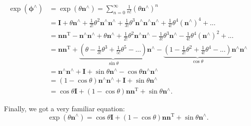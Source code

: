 \begin{align*}
\exp \left( {{\boldsymbol{\phi} ^ \wedge }} \right) &= \exp \left( {\theta {\mathbf{n}^ \wedge }} \right) = \sum\limits_ {n = 0}^\infty {\frac{1}{{n!}}{{\left( {\theta {\mathbf{n}^ \wedge }} \right)}^n}} \\
&= \mathbf{I} + \theta {\mathbf{n}^ \wedge } + \frac{1}{{2!}}{\theta ^2}{\mathbf{n}^ \wedge }{\mathbf{n}^ \wedge } + \frac{1}{{3!}}{\theta ^3}{\mathbf{n}^ \wedge }{\mathbf{n}^ \wedge }{\mathbf{n}^ \wedge } + \frac{1}{{4!}}{\theta ^4}{\left( {{\mathbf{n}^ \wedge }} \right)^4} + ... \\
&= \mathbf{n} {\mathbf{n}^\mathrm{T}} - {\mathbf{n}^ \wedge }{\mathbf{n}^ \wedge } + \theta {\mathbf{n} ^ \wedge } + \frac{1}{{2!}}\theta^2 {\mathbf{n}^ \wedge }{\mathbf{n}^ \wedge } - \frac{1}{{3! }}{\theta ^3}{\mathbf{n}^ \wedge } - \frac{1}{{4!}}{\theta ^4}{\left( {{\mathbf{n}^ \wedge }} \right)^2} + ...\\
&= \mathbf{n}{\mathbf{n}^\mathrm{T}} + \underbrace{\left( {\theta - \frac{1}{{3!}}{\theta ^3} + \frac{1}{{5!}}{\theta ^5} - ...} \right)}_{\sin \theta} {\mathbf{n}^ \wedge } - \underbrace{\left( { 1 - \frac{1}{{2!}}{\theta ^2} + \frac{1}{{4!}}{\theta ^4} - ...} \right)}_{\cos \theta}{\mathbf{n}^ \wedge }{\mathbf{n}^ \wedge }\\
&= {\mathbf{n}^ \wedge }{\mathbf{n}^ \wedge } + \mathbf{I} + \sin \theta {\mathbf{n}^ \wedge } - \cos \theta {\mathbf{n}^ \wedge }{\mathbf{n}^ \wedge }\\
&= (1 - \cos \theta ){\mathbf{n}^ \wedge }{\mathbf{n}^ \wedge } + \mathbf{I} + \sin \theta {\mathbf{n}^ \wedge }\\
&= \cos \theta \mathbf{I} + (1 - \cos \theta )\mathbf{n}{\mathbf{n}^\mathrm{T}} + \sin \theta {\mathbf{n}^ \wedge }.
\end{align*}

Finally, we got a very familiar equation:
\begin{equation}
\exp( \theta \mathbf{n}^\wedge ) = \cos \theta \mathbf{I} + (1 - \cos \theta )\mathbf{n}{\mathbf{n}^\mathrm{T} } + \sin \theta {\mathbf{n}^ \wedge }.
\end{equation}

